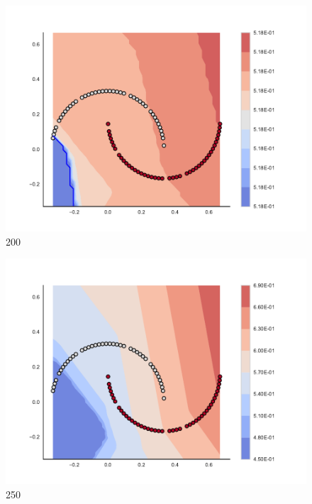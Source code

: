 \begin{subfigure}[b]{0.09\textwidth}
    \includegraphics[clip, trim=2.35cm 1.75cm 4.5cm 0cm,width=\textwidth]{img/convergence/200.pdf}
    \caption{200}
    \label{fig:convergence_200}
\end{subfigure}
%
\begin{subfigure}[b]{0.09\textwidth}
    \includegraphics[clip, trim=2.35cm 1.75cm 4.5cm 0cm,width=\textwidth]{img/convergence/250.pdf}
    \caption{250}
    \label{fig:convergence_250}
\end{subfigure}
%
